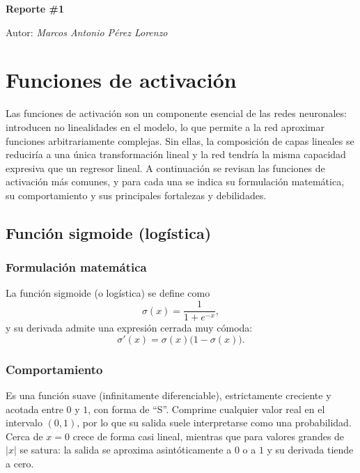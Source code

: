 \documentclass[12pt,a4paper]{article}
\begin{document}
\begin{titlepage}

  \centering
  {\huge\bfseries Reporte \#1\par}
	{\Large Autor: \itshape Marcos Antonio Pérez Lorenzo\par}
\end{titlepage}

\pagebreak

\section{Funciones de activación}

Las funciones de activación son un componente esencial de las redes neuronales: introducen no linealidades en el modelo, lo que permite a la red aproximar funciones arbitrariamente complejas. Sin ellas, la composición de capas lineales se reduciría a una única transformación lineal y la red tendría la misma capacidad expresiva que un regresor lineal. A continuación se revisan las funciones de activación más comunes, y para cada una se indica su formulación matemática, su comportamiento y sus principales fortalezas y debilidades.

\subsection{Función sigmoide (logística)}

\subsubsection{Formulación matemática}
La función sigmoide (o logística) se define como
\begin{equation*}
\sigma(x) = \frac{1}{1 + e^{-x}},
\end{equation*}
y su derivada admite una expresión cerrada muy cómoda:
\begin{equation*}
\sigma'(x) = \sigma(x)\bigl(1 - \sigma(x)\bigr).
\end{equation*}

\subsubsection{Comportamiento}
Es una función suave (infinitamente diferenciable), estrictamente creciente y acotada entre $0$ y $1$, con forma de ``S''. Comprime cualquier valor real en el intervalo $(0, 1)$, por lo que su salida suele interpretarse como una probabilidad. Cerca de $x = 0$ crece de forma casi lineal, mientras que para valores grandes de $|x|$ se satura: la salida se aproxima asintóticamente a $0$ o a $1$ y su derivada tiende a cero.
\end{document}
